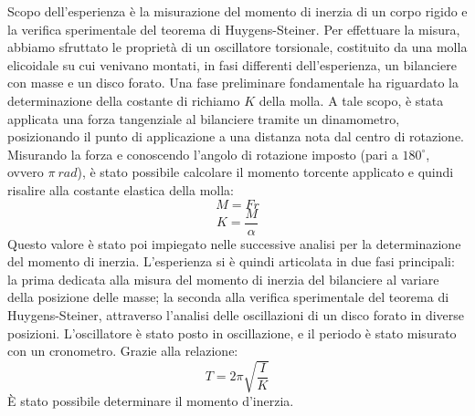 Scopo dell'esperienza è la misurazione del momento di inerzia di un corpo rigido e la verifica sperimentale del teorema di Huygens-Steiner. Per effettuare la misura, abbiamo sfruttato le proprietà di un oscillatore torsionale, costituito da una molla elicoidale su cui venivano montati, in fasi differenti dell'esperienza, un bilanciere con masse e un disco forato. Una fase preliminare fondamentale ha riguardato la determinazione della costante di richiamo $K$ della molla. A tale scopo, è stata applicata una forza tangenziale al bilanciere tramite un dinamometro, posizionando il punto di applicazione a una distanza nota dal centro di rotazione. Misurando la forza e conoscendo l'angolo di rotazione imposto (pari a $180^{\circ}$, ovvero $\pi \ rad$), è stato possibile calcolare il momento torcente applicato e quindi risalire alla costante elastica della molla:
\begin{equation}
	M = Fr
\end{equation}
\begin{equation}
	K=\frac{M}{\alpha}
\end{equation}
Questo valore è stato poi impiegato nelle successive analisi per la determinazione del momento di inerzia. L'esperienza si è quindi articolata in due fasi principali: la prima dedicata alla misura del momento di inerzia del bilanciere al variare della posizione delle masse; la seconda alla verifica sperimentale del teorema di Huygens-Steiner, attraverso l'analisi delle oscillazioni di un disco forato in diverse posizioni. L'oscillatore è stato posto in oscillazione, e il periodo è stato misurato con un cronometro. Grazie alla relazione:
\begin{equation}
	T=2\pi\sqrt{\frac{I}{K}}
\end{equation}
È stato possibile determinare il momento d'inerzia.